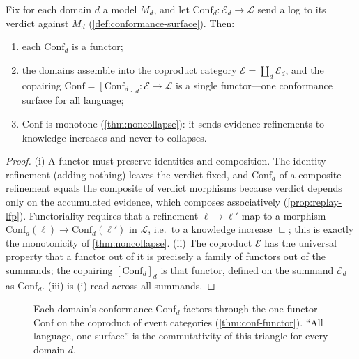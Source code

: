 \begin{theorem}
\label{thm:conf-functor}
Fix for each domain $d$ a model $M_d$, and let $\mathrm{Conf}_d\colon\mathcal E_d\to
\mathcal L$ send a log to its verdict against $M_d$ (\cref{def:conformance-surface}).
Then:
\begin{enumerate}[label=(\roman*),leftmargin=2.2em]
  \item each $\mathrm{Conf}_d$ is a functor;
  \item the domains assemble into the coproduct category
  $\mathcal E=\coprod_d\mathcal E_d$, and the copairing
  $\mathrm{Conf}=[\mathrm{Conf}_d]_d\colon\mathcal E\to\mathcal L$ is a single
  functor---one conformance surface for all language;
  \item $\mathrm{Conf}$ is monotone (\cref{thm:noncollapse}): it sends evidence
  refinements to knowledge increases and never to collapses.
\end{enumerate}
\end{theorem}
\begin{proof}
(i) A functor must preserve identities and composition. The identity refinement
(adding nothing) leaves the verdict fixed, and $\mathrm{Conf}_d$ of a composite
refinement equals the composite of verdict morphisms because verdict depends only on
the accumulated evidence, which composes associatively (\cref{prop:replay-lfp}).
Functoriality requires that a refinement $\ell\to\ell'$ map to a morphism
$\mathrm{Conf}_d(\ell)\to\mathrm{Conf}_d(\ell')$ in $\mathcal L$, i.e.\ to a
knowledge increase $\sqsubseteq$; this is exactly the monotonicity of
\cref{thm:noncollapse}. (ii) The coproduct $\mathcal E$ has the universal property
that a functor out of it is precisely a family of functors out of the summands; the
copairing $[\mathrm{Conf}_d]_d$ is that functor, defined on the summand $\mathcal
E_d$ as $\mathrm{Conf}_d$. (iii) is (i) read across all summands.
\end{proof}

\begin{figure}[t]
\centering
{}
\caption[The conformance functor]{Each domain's conformance $\mathrm{Conf}_d$
factors through the one functor $\mathrm{Conf}$ on the coproduct of event
categories (\cref{thm:conf-functor}). ``All language, one surface'' is the
commutativity of this triangle for every domain $d$.}
\label{fig:conf-functor}
\end{figure}

